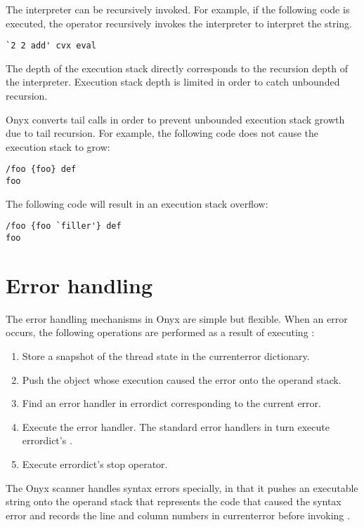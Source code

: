 The interpreter can be recursively invoked.  For example, if the following code
is executed, the  operator
recursively invokes the interpreter to interpret the string.
\begin{verbatim}
`2 2 add' cvx eval
\end{verbatim}

The depth of the execution stack directly corresponds to the recursion depth of
the interpreter.  Execution stack depth is limited in order to catch unbounded
recursion.

Onyx converts tail calls in order to prevent unbounded execution stack growth
due to tail recursion.  For example, the following code does not cause the
execution stack to grow:

\begin{verbatim}
/foo {foo} def
foo
\end{verbatim}

The following code will result in an execution stack overflow:

\begin{verbatim}
/foo {foo `filler'} def
foo
\end{verbatim}

\section{Error handling}

The error handling mechanisms in Onyx are simple but flexible.  When an error
occurs, the following operations are performed as a result of executing
:
\begin{enumerate}
\item{Store a snapshot of the thread state in the currenterror dictionary.}
\item{Push the object whose execution caused the error onto the operand stack.}
\item{Find an error handler in errordict corresponding to the current error.}
\item{Execute the error handler.  The standard error handlers in turn execute
errordict's .}
\item{Execute errordict's stop operator.}
\end{enumerate}

The Onyx scanner handles syntax errors specially, in that it pushes an
executable string onto the operand stack that represents the code that caused
the syntax error and records the line and column numbers in currenterror before
invoking .

